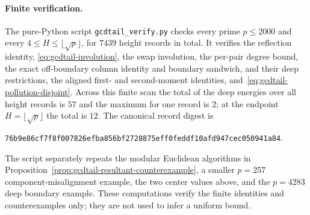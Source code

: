 \paragraph{Finite verification.}
The pure-Python script \texttt{gcdtail\_verify.py} checks every prime
$p\leq2000$ and every $4\leq H\leq\lfloor\sqrt p\rfloor$, for $7439$
height records in total.  It verifies the reflection identity,
\eqref{eq:gcdtail-involution}, the swap involution, the per-pair degree
bound, the exact off-boundary column identity and boundary sandwich, and
their deep restrictions, the aligned first- and second-moment identities,
and~\eqref{eq:gcdtail-pollution-disjoint}.  Across this finite scan the
total of the deep energies over all height records is $57$ and the maximum
for one record is $2$; at the endpoint
$H=\lfloor\sqrt p\rfloor$ the total is $12$.
The canonical record digest is
\begin{center}
 {\small\texttt{76b9e86cf7f8f007826efba856bf2728875eff0feddf10afd947cec050941a84}}.
\end{center}
The script separately repeats the modular Euclidean algorithms in
Proposition~\ref{prop:gcdtail-resultant-counterexample}, a smaller
$p=257$ component-misalignment example, the two center values above, and
the $p=4283$ deep boundary example.  These computations verify the finite
identities and counterexamples only; they are not used to infer a uniform
bound.
